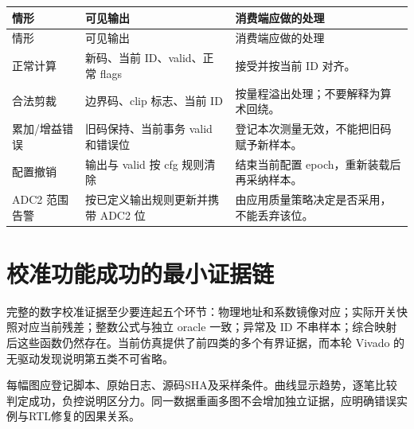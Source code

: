 \begin{longtable}{>{\raggedright\arraybackslash}p{27mm}>{\raggedright\arraybackslash}p{40mm}>{\raggedright\arraybackslash}p{78mm}}
\toprule 情形&可见输出&消费端应做的处理\\\midrule\endfirsthead
\toprule 情形&可见输出&消费端应做的处理\\\midrule\endhead
正常计算&新码、当前 ID、valid、正常 flags&接受并按当前 ID 对齐。\\
合法剪裁&边界码、clip 标志、当前 ID&按量程溢出处理；不要解释为算术回绕。\\
累加/增益错误&旧码保持、当前事务 valid 和错误位&登记本次测量无效，不能把旧码赋予新样本。\\
配置撤销&输出与 valid 按 cfg 规则清除&结束当前配置 epoch，重新装载后再采纳样本。\\
ADC2 范围告警&按已定义输出规则更新并携带 ADC2 位&由应用质量策略决定是否采用，不能丢弃该位。\\
\bottomrule\end{longtable}

\section{校准功能成功的最小证据链}
完整的数字校准证据至少要连起五个环节：物理地址和系数镜像对应；实际开关快照对应当前残差；整数公式与独立 oracle 一致；异常及 ID 不串样本；综合映射后这些函数仍然存在。当前仿真提供了前四类的多个有界证据，而本轮 Vivado 的无驱动发现说明第五类不可省略。

每幅图应登记脚本、原始日志、源码SHA及采样条件。曲线显示趋势，逐笔比较判定成功，负控说明区分力。同一数据重画多图不会增加独立证据，应明确错误实例与RTL修复的因果关系。
